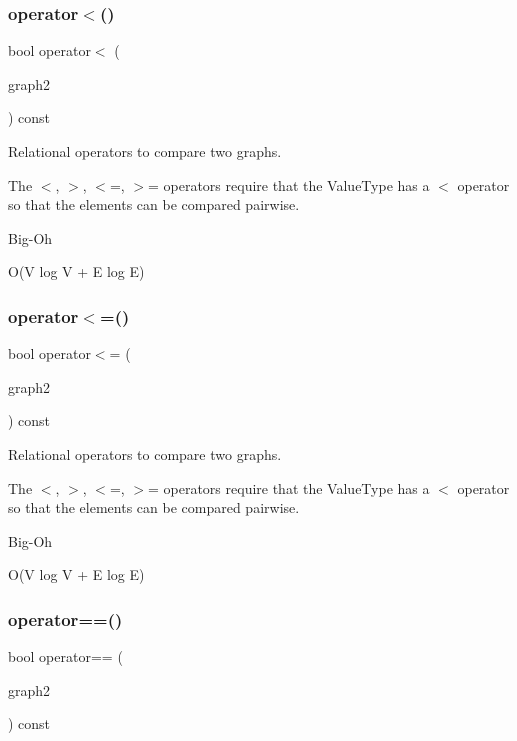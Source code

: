 \subsubsection{\texorpdfstring{operator$<$()}{operator<()}}
{\footnotesize\ttfamily bool operator$<$ (\begin{DoxyParamCaption}\item[{const \mbox{\hyperlink{classGraph}{Graph}}$<$ Node\+Type, Arc\+Type $>$ \&}]{graph2 }\end{DoxyParamCaption}) const}



Relational operators to compare two graphs. 

The $<$, $>$, $<$=, $>$= operators require that the Value\+Type has a $<$ operator so that the elements can be compared pairwise. \begin{DoxyRefDesc}{Big-\/\+Oh}
\item[\mbox{\hyperlink{BigOh__BigOh000095}{Big-\/\+Oh}}]O(V log V + E log E) \end{DoxyRefDesc}
\mbox{\label{classGraph_a352607f2b21dd87b3d2a3957bbf3da7b}} 
\subsubsection{\texorpdfstring{operator$<$=()}{operator<=()}}
{\footnotesize\ttfamily bool operator$<$= (\begin{DoxyParamCaption}\item[{const \mbox{\hyperlink{classGraph}{Graph}}$<$ Node\+Type, Arc\+Type $>$ \&}]{graph2 }\end{DoxyParamCaption}) const}



Relational operators to compare two graphs. 

The $<$, $>$, $<$=, $>$= operators require that the Value\+Type has a $<$ operator so that the elements can be compared pairwise. \begin{DoxyRefDesc}{Big-\/\+Oh}
\item[\mbox{\hyperlink{BigOh__BigOh000096}{Big-\/\+Oh}}]O(V log V + E log E) \end{DoxyRefDesc}
\mbox{\label{classGraph_a188f85939e3fe6ed2d411f622287f722}} 
\subsubsection{\texorpdfstring{operator==()}{operator==()}}
{\footnotesize\ttfamily bool operator== (\begin{DoxyParamCaption}\item[{const \mbox{\hyperlink{classGraph}{Graph}}$<$ Node\+Type, Arc\+Type $>$ \&}]{graph2 }\end{DoxyParamCaption}) const}



